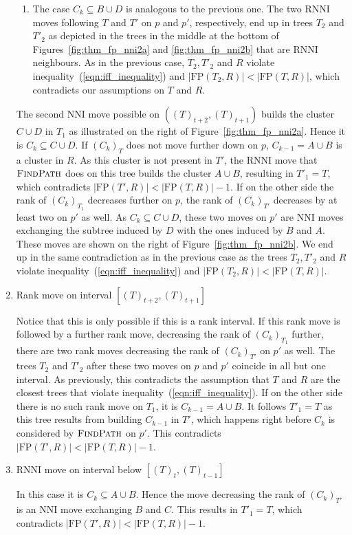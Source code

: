 \documentclass{amsart}
\newcommand{\rnni}{\mathrm{RNNI}}
\newcommand{\findpath}{\textsc{FindPath}}
\newcommand{\nni}{\mathrm{NNI}}
\newcommand{\fp}{\mathrm{FP}}
\begin{document}
\begin{enumerate}[label = 1.{\arabic*}]
\begin{enumerate}[label = \theenumi.\arabic*]
	\item
	The case $C_k \subseteq B \cup D$ is analogous to the previous one.
    The two $\rnni$ moves following $T$ and $T'$ on $p$ and $p'$, respectively, end up in trees $T_2$ and $T'_2$ as depicted in the trees in the middle at the bottom of Figures~\ref{fig:thm_fp_nni2a} and \ref{fig:thm_fp_nni2b} that are $\rnni$ neighbours.
    As in the previous case, $T_2, T'_2$ and $R$ violate inequality~(\ref{eqn:iff_inequality}) and $|\fp(T_2,R)| < |\fp(T,R)|$, which contradicts our assumptions on $T$ and $R$.
\end{enumerate}

The second $\nni$ move possible on $((T)_{t+2},(T)_{t+1})$ builds the cluster $C \cup D$ in $T_1$ as illustrated on the right of Figure~\ref{fig:thm_fp_nni2a}.
Hence it is $C_k \subseteq C \cup D$.
If $(C_k)_T$ does not move further down on $p$, $C_{k-1} = A \cup B$ is a cluster in $R$.
As this cluster is not present in $T'$, the $\rnni$ move that $\findpath$ does on this tree builds the cluster $A \cup B$, resulting in $T'_1 = T$, which contradicts $|\fp(T',R)| < |\fp(T,R)| - 1$.
If on the other side the rank of $(C_k)_{T_1}$ decreases further on $p$, the rank of $(C_k)_{T'}$ decreases by at least two on $p'$ as well.
As $C_k \subseteq C \cup D$, these two moves on $p'$ are $\nni$ moves exchanging the subtree induced by $D$ with the ones induced by $B$ and $A$.
These moves are shown on the right of Figure~\ref{fig:thm_fp_nni2b}.
We end up in the same contradiction as in the previous case as the trees $T_2, T'_2$ and $R$ violate inequality~(\ref{eqn:iff_inequality}) and $|\fp(T_2,R)| < |\fp(T,R)|$.

\item Rank move on interval $[(T)_{t+2},(T)_{t+1}]$

Notice that this is only possible if this is a rank interval.
If this rank move is followed by a further rank move, decreasing the rank of $(C_k)_{T_1}$ further, there are two rank moves decreasing the rank of $(C_k)_{T'}$ on $p'$ as well.
The trees $T_2$ and $T'_2$ after these two moves on $p$ and $p'$ coincide in all but one interval.
As previously, this contradicts the assumption that $T$ and $R$ are the closest trees that violate inequality~(\ref{eqn:iff_inequality}).
If on the other side there is no such rank move on $T_1$, it is $C_{k-1} = A \cup B$.
It follows $T'_1 = T$ as this tree results from building $C_{k-1}$ in $T'$, which happens right before $C_k$ is considered by $\findpath$ on $p'$.
This contradicts $|\fp(T',R)| < |\fp(T,R)| - 1$.

\item $\rnni$ move on interval below $[(T)_{t},(T)_{t-1}]$

In this case it is $C_k \subseteq A \cup B$.
Hence the move decreasing the rank of $(C_k)_{T'}$ is an $\nni$ move exchanging $B$ and $C$.
This results in $T'_1 = T$, which contradicts $|\fp(T',R)| < |\fp(T,R)| - 1$.
\end{enumerate}
\end{document}
